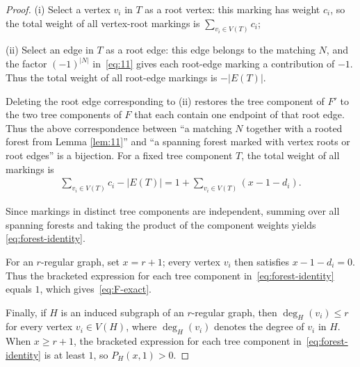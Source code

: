 \documentclass[11pt, a4paper]{article}
\theoremstyle{plain}
\begin{document}
\begin{proof}
(i) Select a vertex $v_i$ in $T$ as a root vertex: this marking has weight $c_i$,
so the total weight of all vertex-root markings is $\sum_{v_i\in V(T)}c_i$;

(ii) Select an edge in $T$ as a root edge: this edge belongs to the matching $N$, and the factor $(-1)^{|N|}$ in~\eqref{eq:11} gives each root-edge marking a contribution of $-1$.
Thus the total weight of all root-edge markings is $-|E(T)|$.

\noindent Deleting the root edge corresponding to (ii) restores the tree component of $F'$ to the two tree components of $F$ that each contain
one endpoint of that root edge.
Thus the above correspondence between ``a matching $N$ together with a rooted forest from Lemma \ref{lem:11}'' and
``a spanning forest marked with vertex roots or root edges'' is a bijection.
For a fixed tree component $T$, the total weight of all markings is
\begin{align*}
\sum_{v_i\in V(T)}c_i-|E(T)|
=1+\sum_{v_i\in V(T)}(x-1-d_i).
\end{align*}

Since markings in distinct tree components are independent, summing over all spanning forests and taking the product of the component weights yields \eqref{eq:forest-identity}.

For an $r$-regular graph, set $x=r+1$; every vertex $v_i$ then satisfies $x-1-d_i=0$.
Thus the bracketed expression for each tree component in~\eqref{eq:forest-identity} equals $1$,
which gives~\eqref{eq:F-exact}.

Finally, if $H$ is an induced subgraph of an $r$-regular graph,
then $\deg_H(v_i)\leq r$ for every vertex $v_i \in V(H)$,
where $\deg_H(v_i)$ denotes the degree of $v_i$ in $H$.
When $x\geq r+1$,
the bracketed expression for each tree component in~\eqref{eq:forest-identity} is at least $1$, so $P_H(x,1)>0$.
\end{proof}
\end{document}
